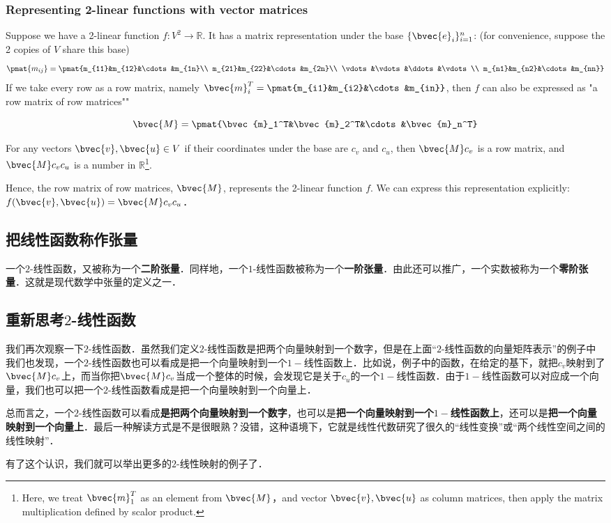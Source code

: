 \subsubsection{Representing 2-linear functions with vector matrices}

Suppose we have a 2-linear function $f:V^2\rightarrow\mathbb{R}$. It has a matrix representation under the base $\{\bvec{e}_i\}_{i=1}^n$: (for convenience, suppose the 2 copies of $V$ share this base)
\begin{equation}
\pmat{m_{ij}}=\pmat{m_{11}&m_{12}&\cdots&m_{1n}\\ m_{21}&m_{22}&\cdots&m_{2n}\\ \vdots&\vdots&\ddots&\vdots\\ m_{n1}&m_{n2}&\cdots&m_{nn}}
\end{equation}
If we take every row as a row matrix, namely $\bvec{m}_i^T=\pmat{m_{i1}&m_{i2}&\cdots&m_{in}}$, then $f$ can also be expressed as "a row matrix of row matrices"" 

\begin{equation}
\bvec{M}=\pmat{\bvec{m}_1^T&\bvec{m}_2^T&\cdots&\bvec{m}_n^T}
\end{equation}

For any vectors $\bvec{v}, \bvec{u}\in V$ if their coordinates under the base are $c_v$ and $c_u$, then $\bvec{M}c_v$ is a row matrix, and $\bvec{M}c_vc_u$ is a number in $\mathbb{R}$\footnote{Here, we treat $\bvec{m}_1^T$ as an element from $\bvec{M}$，and vector $\bvec{v}, \bvec{u}$ as column matrices, then apply the matrix multiplication defined by scalor product. }. 

Hence, the row matrix of row matrices, $\bvec{M}$, represents the 2-linear function $f$. We can express this representation explicitly: $f(\bvec{v}, \bvec{u})=\bvec{M}c_vc_u$．

\subsection{把线性函数称作张量}

一个$2$-线性函数，又被称为一个\textbf{二阶张量}．同样地，一个$1$-线性函数被称为一个\textbf{一阶张量}．由此还可以推广，一个实数被称为一个\textbf{零阶张量}．这就是现代数学中张量的定义之一．

\subsection{重新思考$2$-线性函数}
我们再次观察一下$2$-线性函数．虽然我们定义$2$-线性函数是把两个向量映射到一个数字，但是在上面“$2$-线性函数的向量矩阵表示”的例子中我们也发现，一个$2$-线性函数也可以看成是把一个向量映射到一个$1-$线性函数上．比如说，例子中的函数，在给定的基下，就把$c_v$映射到了$\bvec{M}c_v$上，而当你把$\bvec{M}c_v$当成一个整体的时候，会发现它是关于$c_u$的一个$1-$线性函数．由于$1-$线性函数可以对应成一个向量，我们也可以把一个$2$-线性函数看成是把一个向量映射到一个向量上．

总而言之，一个$2$-线性函数可以看成\textbf{是把两个向量映射到一个数字}，也可以是\textbf{把一个向量映射到一个$1-$线性函数上}，还可以是\textbf{把一个向量映射到一个向量上}．最后一种解读方式是不是很眼熟？没错，这种语境下，它就是线性代数研究了很久的“线性变换”或“两个线性空间之间的线性映射”．

有了这个认识，我们就可以举出更多的$2$-线性映射的例子了．







